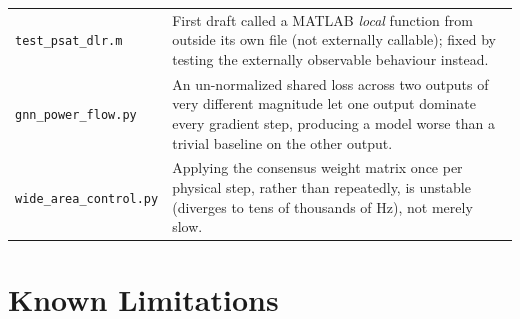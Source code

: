 \documentclass[11pt]{report}
\newcommand{\pkg}[1]{\texttt{#1}}
\theoremstyle{plain}
\theoremstyle{definition}
\theoremstyle{remark}
\begin{document}
\begin{longtable}{@{}p{3.6cm}p{11.9cm}@{}}
\pkg{test\_\hspace{0pt}psat\_\hspace{0pt}dlr.m} & First draft called a MATLAB \emph{local} function from outside its own file (not externally callable); fixed by testing the externally observable behaviour instead. \\
\pkg{gnn\_\hspace{0pt}power\_\hspace{0pt}flow.py} & An un-normalized shared loss across two outputs of very different magnitude let one output dominate every gradient step, producing a model worse than a trivial baseline on the other output. \\
\pkg{wide\_\hspace{0pt}area\_\hspace{0pt}control.py} & Applying the consensus weight matrix once per physical step, rather than repeatedly, is unstable (diverges to tens of thousands of Hz), not merely slow. \\
\bottomrule
\end{longtable}

\chapter{Known Limitations}
\label{ch:limitations}
\end{document}
